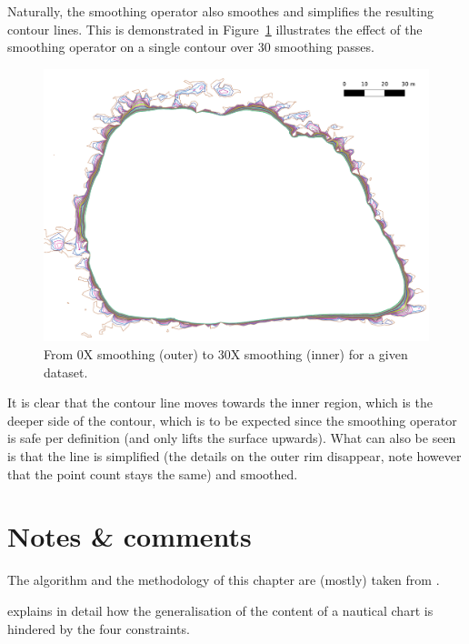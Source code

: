 Naturally, the smoothing operator also smoothes and simplifies the resulting contour lines. 
This is demonstrated in Figure~\ref{fig:zl1845lineview} illustrates the effect of the smoothing operator on a single contour over 30 smoothing passes. 
\begin{figure}
  \centering
  \includegraphics[width=0.95\linewidth]{figs/zl1845detailcontours0-30.pdf}
  \caption{From 0X smoothing (outer) to 30X smoothing (inner) for a given dataset.}
\label{fig:zl1845lineview}
\end{figure}
It is clear that the contour line moves towards the inner region, which is the deeper side of the contour, which is to be expected since the smoothing operator is safe per definition (and only lifts the surface upwards). 
What can also be seen is that the line is simplified (the details on the outer rim disappear, note however that the point count stays the same) and smoothed. 


%
\section{Notes \& comments}

The algorithm and the methodology of this chapter are (mostly) taken from \citet{Peters14}.

\citet{Zhang11} explains in detail how the generalisation of the content of a nautical chart is hindered by the four constraints.

